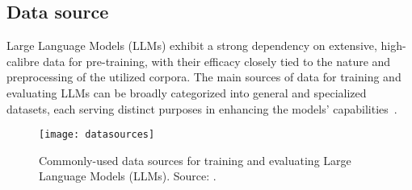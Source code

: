 \subsection{Data source}
\label{subsec:data-source}

Large Language Models (LLMs) exhibit a strong dependency on extensive, high-calibre data for pre-training, with their efficacy closely tied to the nature and preprocessing of the utilized corpora.
The main sources of data for training and evaluating LLMs can be broadly categorized into general and specialized datasets, each serving distinct purposes in enhancing the models' capabilities~\cite{survey}.\\

\begin{figure}[h]
	\centering
	\texttt{[image: datasources]}
	\caption{Commonly-used data sources for training and evaluating Large Language Models (LLMs). Source: \textcite{survey}.}
	\label{fig:data_sources}
\end{figure}


